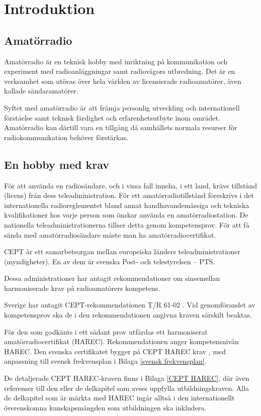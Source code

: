 \chapter*{Introduktion}
\section*{Amatörradio}
Amatörradio är en teknisk hobby med inriktning på kommunikation och experiment
med radioanläggningar samt radiovågors utbredning. Det är en verksamhet som
utövas över hela världen av licensierade radioamatörer, även kallade
sändaramatörer.

Syftet med amatörradio är att främja personlig utveckling och internationell
förståelse samt teknisk färdighet och erfarenhetsutbyte inom området.
Amatörradio kan därtill vara en tillgång då samhällets normala resurser för
radiokommunikation behöver förstärkas.

\section*{En hobby med krav}

För att använda en radiosändare, och i vissa fall inneha, i ett land, krävs
tillstånd (licens) från dess teleadministration.
För ett amatörradiotillstånd föreskrivs i det internationella radioreglementet
\cite{ITU-RR} bland annat handhavandemässiga och tekniska kvalifikationer hos
varje person som önskar använda en amatörradiostation.
De nationella teleadministrationerna tillser detta genom kompetensprov.
För att få sända med amatörradiosändare måste man ha amatörradiocertifikat.

CEPT är ett samarbetsorgan mellan europeiska länders teleadministrationer
(myndigheter).
En av dem är svenska Post- och telestyrelsen -- PTS.

Dessa administrationer har antagit rekommendationer om sinsemellan
harmoniserade krav på radioamatörers kompetens.

Sverige har antagit CEPT-rekommendationen T/R 61-02 \cite{TR6102}.
Vid genomförandet av kompetensprov ska de i den rekommendationen
angivna kraven särskilt beaktas.

För den som godkänts i ett sådant prov utfärdas ett harmoniserat
amatörradiocertifikat (HAREC).
Rekommendationen anger kompetensnivån HAREC.
Den svenska certifikatet bygger på CEPT HAREC krav \cite{TR6102},
med anpassning till svensk frekvensplan i Bilaga \ref{svensk frekvensplan}.

De detaljerade CEPT HAREC-kraven finns i Bilaga \ref{CEPT HAREC}, där även
referenser till den eller de delkapitel som avses uppfylla utbildningskraven.
Alla de delkapitel som är märkta med HAREC ingår alltså i den internationellt
överenskomna kunskapsmängden som utbildningen ska inkludera.

